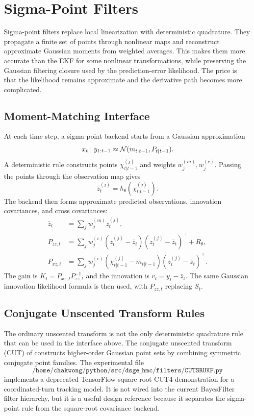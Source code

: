 \chapter{Sigma-Point Filters}
\label{ch:bf-sigma-point-filters}

Sigma-point filters replace local linearization with deterministic quadrature.
They propagate a finite set of points through nonlinear maps and reconstruct
approximate Gaussian moments from weighted averages.  This makes them more
accurate than the EKF for some nonlinear transformations, while preserving the
Gaussian filtering closure used by the prediction-error likelihood.  The price
is that the likelihood remains approximate and the derivative path becomes
more complicated.

\section{Moment-Matching Interface}
\label{sec:bf-sigma-point-interface}

At each time step, a sigma-point backend starts from a Gaussian approximation
\[
  x_t \mid y_{1:t-1}
  \approx \mathcal{N}(m_{t|t-1},P_{t|t-1}).
\]
A deterministic rule constructs points
$\chi^{(j)}_{t|t-1}$ and weights $w_j^{(m)},w_j^{(c)}$.  Passing the points
through the observation map gives
\[
  z_t^{(j)}=h_\theta(\chi^{(j)}_{t|t-1}).
\]
The backend then forms approximate predicted observations, innovation
covariances, and cross covariances:
\begin{align}
  \bar z_t &= \sum_j w_j^{(m)}z_t^{(j)}, \\
  P_{zz,t} &= \sum_j w_j^{(c)}
    (z_t^{(j)}-\bar z_t)(z_t^{(j)}-\bar z_t)^\top + R_\theta, \\
  P_{xz,t} &= \sum_j w_j^{(c)}
    (\chi^{(j)}_{t|t-1}-m_{t|t-1})
    (z_t^{(j)}-\bar z_t)^\top .
\end{align}
The gain is $K_t=P_{xz,t}P_{zz,t}^{-1}$ and the innovation is
$v_t=y_t-\bar z_t$.  The same Gaussian innovation likelihood formula is then
used, with $P_{zz,t}$ replacing $S_t$.

\section{Conjugate Unscented Transform Rules}
\label{sec:bf-cut-rules}

The ordinary unscented transform is not the only deterministic quadrature rule
that can be used in the interface above.  The conjugate unscented transform
(CUT) of \citet{adurthi2012cut,adurthi2012cutfiltering} constructs higher-order
Gaussian point sets by combining symmetric conjugate point families.  The
experimental file
\[
  \texttt{/home/chakwong/python/src/dsge\_hmc/filters/CUTSRUKF.py}
\]
implements a deprecated TensorFlow square-root CUT4 demonstration for a
coordinated-turn tracking model.  It is not wired into the current BayesFilter
filter hierarchy, but it is a useful design reference because it separates the
sigma-point rule from the square-root covariance backend.

